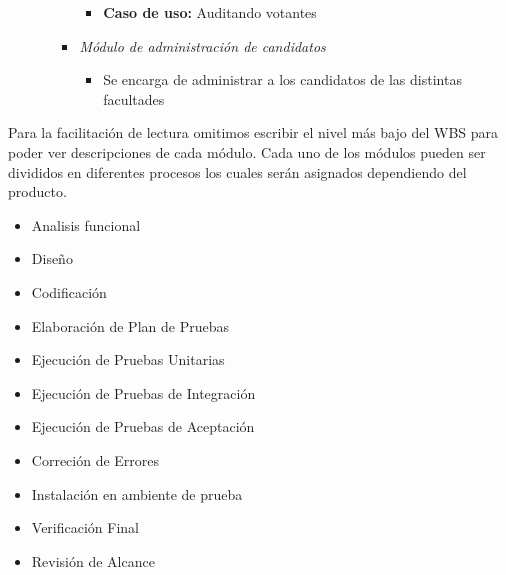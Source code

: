 \begin{itemize}
\begin{itemize}
\begin{itemize}
\begin{itemize}
 \item {\bf Caso de uso:} Auditando votantes
\end{itemize}
 \item \emph{M\'odulo de administración de candidatos}
\begin{itemize}
 \item Se encarga de administrar a los candidatos de las distintas facultades
\end{itemize}
\end{itemize}
\end{itemize}
\end{itemize}


Para la facilitación de lectura omitimos escribir el nivel más bajo del WBS para poder ver descripciones de cada m\'odulo. Cada uno de los m\'odulos pueden ser divididos en diferentes procesos
los cuales serán asignados dependiendo del producto.
\begin{itemize}
 \item Analisis funcional
 \item Diseño
 \item Codificación
 \item Elaboración de Plan de Pruebas
 \item Ejecución de Pruebas Unitarias
 \item Ejecución de Pruebas de Integración
 \item Ejecución de Pruebas de Aceptación
 \item Correción de Errores
 \item Instalación en ambiente de prueba
 \item Verificación Final
 \item Revisión de Alcance
\end{itemize}	
